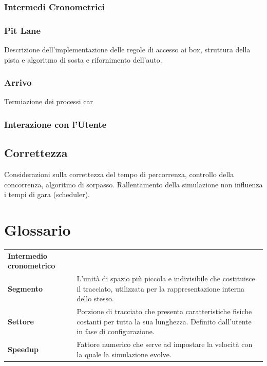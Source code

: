 \documentclass[11pt,a4paper]{report}
\newcommand{\term}[2]{\textbf{#1} & #2 \\}
\begin{document}
\subsection{Intermedi Cronometrici}
\subsection{Pit Lane}
Descrizione dell'implementazione delle regole di accesso ai box, struttura della pista e algoritmo di sosta e rifornimento dell'auto.
\subsection{Arrivo}
Termiazione dei processi car
\subsection{Interazione con l'Utente}

\section{Correttezza}
Considerazioni sulla correttezza del tempo di percorrenza, controllo della concorrenza, algoritmo di sorpasso.
Rallentamento della simulazione non influenza i tempi di gara (scheduler).
\appendix

\chapter{Glossario}

\begin{tabularx}{\textwidth}{lX}
\term{Intermedio cronometrico}{}
\term{Segmento}{L'unità di spazio più piccola e indivisibile che costituisce il tracciato, utilizzata per la rappresentazione interna dello stesso.}
\term{Settore}{Porzione di tracciato che presenta caratteristiche fisiche costanti per tutta la sua lunghezza. Definito dall'utente in fase di configurazione.}
\term{Speedup}{Fattore numerico che serve ad impostare la velocità con la quale la simulazione evolve.}
\end{tabularx}
\end{document}
